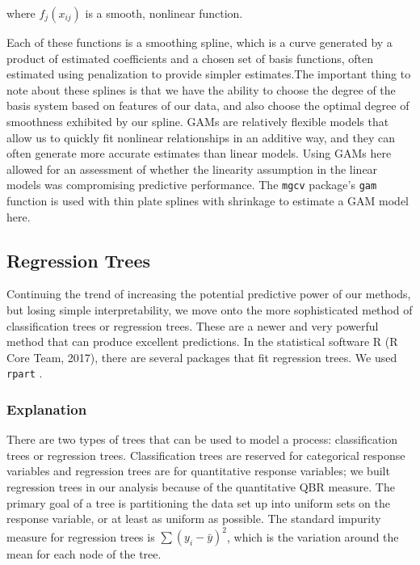 \documentclass[12pt]{article}\usepackage[]{graphicx}\usepackage[]{color}
\begin{document}
\noindent
where $f_{j}(x_{ij})$ is a smooth, nonlinear function.

Each of these functions is a smoothing spline, which is a curve generated by a product of estimated coefficients and a chosen set of basis functions, often estimated using penalization to provide simpler estimates.The important thing to note about these splines is that we have the ability to choose the degree of the basis system based on features of our data, and also choose the optimal degree of smoothness exhibited by our spline. GAMs are relatively flexible models that allow us to quickly fit nonlinear relationships in an additive way, and they can often generate more accurate estimates than linear models. Using GAMs here allowed for an assessment of whether the linearity assumption in the linear models was compromising predictive performance. The \texttt{mgcv} \cite{mgcv} package's \texttt{gam} function is used with thin plate splines with shrinkage to estimate a GAM model here.


\subsection{Regression Trees}
Continuing the trend of increasing the potential predictive power of our methods, but losing simple interpretability, we move onto the more sophisticated method of classification trees or regression trees. These are a newer and very powerful method that can produce excellent predictions. In the statistical software R (R Core Team, 2017), there are several packages that fit regression trees. We used \texttt{rpart} \cite{rpart}.

\subsubsection{Explanation}
There are two types of trees that can be used to model a process: classification trees or regression trees. Classification trees are reserved for categorical response variables and regression trees are for quantitative response variables; we built regression trees in our analysis because of the quantitative QBR measure. The primary goal of a tree is partitioning the data set up into uniform sets on the response variable, or at least as uniform as possible. The standard impurity measure for regression trees is $\sum(y_{i}-\bar{y})^{2}$, which is the variation around the mean for each node of the tree.
\end{document}
